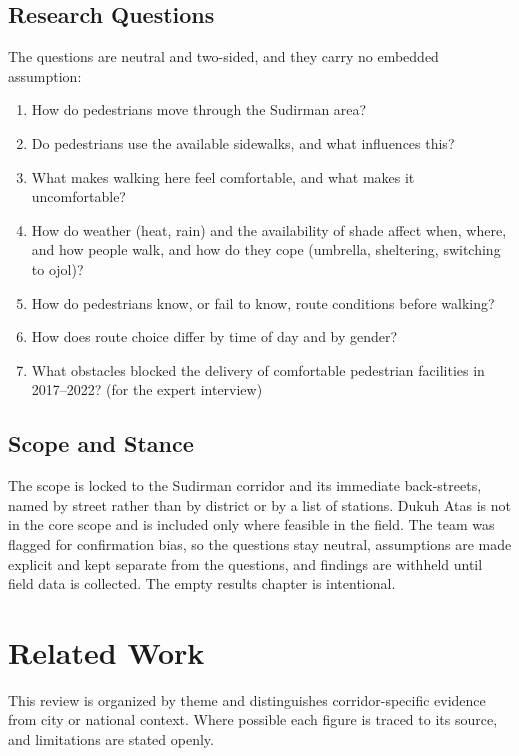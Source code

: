 \documentclass[conference]{IEEEtran}
\begin{document}
\subsection{Research Questions}
The questions are neutral and two-sided, and they carry no embedded assumption:
\begin{enumerate}
  \item How do pedestrians move through the Sudirman area?
  \item Do pedestrians use the available sidewalks, and what influences this?
  \item What makes walking here feel comfortable, and what makes it uncomfortable?
  \item How do weather (heat, rain) and the availability of shade affect when, where, and how
        people walk, and how do they cope (umbrella, sheltering, switching to ojol)?
  \item How do pedestrians know, or fail to know, route conditions before walking?
  \item How does route choice differ by time of day and by gender?
  \item What obstacles blocked the delivery of comfortable pedestrian facilities in 2017--2022?
        (for the expert interview)
\end{enumerate}

\subsection{Scope and Stance}
The scope is locked to the Sudirman corridor and its immediate back-streets, named by street
rather than by district or by a list of stations. Dukuh Atas is not in the core scope and is
included only where feasible in the field. The team was flagged for confirmation bias, so the
questions stay neutral, assumptions are made explicit and kept separate from the questions, and
findings are withheld until field data is collected. The empty results chapter is intentional.

\section{Related Work}
This review is organized by theme and distinguishes corridor-specific evidence from city or
national context. Where possible each figure is traced to its source, and limitations are stated
openly.
\end{document}
